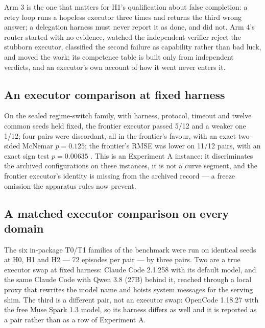 Arm 3 is the one that matters for H1's qualification about false completion: a retry loop runs a hopeless executor three times and returns the third wrong answer; a delegation harness must never report it as done, and did not. Arm 4's router started with no evidence, watched the independent verifier reject the stubborn executor, classified the second failure as capability rather than bad luck, and moved the work; its competence table is built only from independent verdicts, and an executor's own account of how it went never enters it.

\subsection{An executor comparison at fixed harness}

On the sealed regime-switch family, with harness, protocol, timeout and twelve common seeds held fixed, the frontier executor passed 5/12 and a weaker one 1/12; four pairs were discordant, all in the frontier's favour, with an exact two-sided McNemar $p = 0.125$; the frontier's RMSE was lower on 11/12 pairs, with an exact sign test $p = 0.00635$ \citep{yang2026unified}. This is an Experiment A instance: it discriminates the archived configurations on these instances, it is not a curve segment, and the frontier executor's identity is missing from the archived record --- a freeze omission the apparatus rules now prevent.

\subsection{A matched executor comparison on every domain}\label{sec:execcmp}

The six in-package T0/T1 families of the benchmark \citep{yang2026uab} were run on identical seeds at H0, H1 and H2 --- 72 episodes per pair --- by three pairs. Two are a true executor swap at fixed harness: Claude Code 2.1.258 with its default model, and the same Claude Code with Qwen 3.8 (27B) behind it, reached through a local proxy that rewrites the model name and hoists system messages for the serving shim. The third is a different pair, not an executor swap: OpenCode 1.18.27 with the free Muse Spark 1.3 model, so its harness differs as well and it is reported as a pair rather than as a row of Experiment A.

